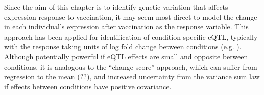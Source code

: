 
Since the aim of this chapter is to identify genetic variation that affects expression response to vaccination, it may seem most direct to model the change in each individual's expression after vaccination as the response variable.
This approach has been applied for identification of condition-specific \gls{eQTL}, typically with the response taking units of log fold change between conditions (e.g. \autocite{maranville2011InteractionsGlucocorticoidTreatment,ackermann2013ImpactNaturalGenetic,shpak2014EQTLAnalysisHuman}).
Although potentially powerful if \gls{eQTL} effects are small and opposite between conditions\autocite{ackermann2013ImpactNaturalGenetic}, 
it is analogous to the \enquote{change score} approach, which can suffer from regression to the mean (??), and increased uncertainty from the variance sum law if effects between conditions have positive covariance\autocite{allison1990ChangeScoresDependent,clifton2019CorrelationBaselineScore}.
%

%
%
%
%
%
%

